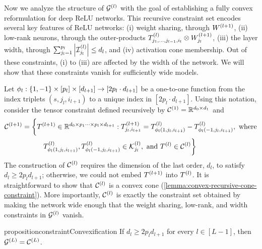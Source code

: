 
Now we analyze the structure of \( \mathcal{G}^{(l)} \) with the goal of establishing a
fully convex reformulation for deep ReLU networks.
This recursive constraint set encodes several key features of ReLU networks:
(i) weight sharing, through \( W^{(l+1)} \), (ii) low-rank neurons, through the
outer-products \( T^{(l)}_{j_1, \ldots, j_{l-1}, i_l} \otimes W^{(l+1)}_{j_l} \),
(iii) the layer width, through
\( \sum_{j_l=1}^{p_l} \left\vert \mathcal{I}_{j_l}^{(l)}\right\vert \leq d_l \),
and (iv) activation cone membership.
Out of these constraints, (i) to (iii) are affected by the width of the
network.
We will show that these constraints vanish for sufficiently wide models.

Let \( \phi_l : \left\{1, -1\right\} \times [p_l] \times [d_{l+1}] \rightarrow [2 p_l \cdot d_{l+1}] \)
be a one-to-one function from the index triplets
\( (s, j_l, i_{l+1}) \) to a unique index in \( [2 p_l \cdot d_{l+1}] \).
Using this notation, consider the tensor constraint defined recursively by
\( \mathcal{C}^{(1)} = \mathbb{R}^{d_0 \times d_1} \) and
\begin{equation}\label{eq:recursive-cone-constraint}
    \begin{aligned}
        \mathcal{C}^{(l+1)}
         & = \bigg\{
        T^{(l+1)} \in \mathbb{R}^{d_0 \times p_1 \cdots \times p_{l} \times d_{l+1}}
        :
        T^{(l+1)}_{j_{l}, i_{l+1}}
        = T^{(l)}_{ \phi_l(1, j_l, i_{l+1})}
        - T^{(l)}_{ \phi_l(-1, j_l, i_{l+1})},
        \text{ where}   \\
         & \hspace{3em}
        T^{(l)}_{\phi_l(1, j_l, i_{l+1})}, T^{(l)}_{ \phi_l(-1, j_l, i_{l+1})}
        \in \mathcal{K}^{(l)}_{j_{l}}, \text{ and }
        T^{(l)} \in \mathcal{C}^{(l)}
        \bigg\}
    \end{aligned}
\end{equation}
The construction of \( \mathcal{C}^{(l)} \) requires the dimension of the
last order, \( d_{l} \), to satisfy \( d_{l} \geq 2 p_{l} d_{l+1} \);
otherwise, we could not embed \( T^{(l+1)} \) into \( T^{(l)} \).
It is straightforward to show that \( \mathcal{C}^{(l)} \) is a convex cone
(\cref{lemma:convex-recursive-cone-constraint}).
More importantly, \( \mathcal{C}^{(l)} \) is exactly the constraint set obtained
by making the network wide enough that the weight sharing, low-rank,
and width constraints in \( \mathcal{G}^{(l)} \) vanish.

\begin{restatable}{proposition}{constraintConvexification}%
    \label{prop:constraint-convexification}
    If \( d_l \geq 2 p_l d_{l+1} \) for every \( l \in [L-1]  \), then
    \( \mathcal{G}^{(L)} = \mathcal{C}^{(L)} \).
\end{restatable}

